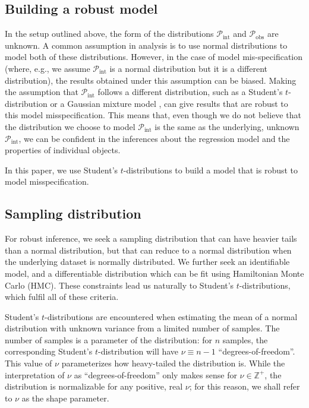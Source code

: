 \documentclass[fleqn,usenatbib]{rasti}
\begin{document}
\subsection{Building a robust model}
\label{sec:formalism.robust}

In the setup outlined above, the form of the distributions
$\mathcal{P}_{\text{int}}$ and
$\mathcal{P}_{\text{obs}}$ are unknown. A common
assumption in analysis is to use normal distributions to model both of these
distributions. However, in the case of model mis-specification (where, e.g., we
assume $\mathcal{P}_{\text{int}}$ is a normal distribution but it is a different
distribution), the results obtained under this assumption can be biased.
Making the assumption that $\mathcal{P}_{\text{int}}$ follows a different
distribution, such as a Student's $t$-distribution \citep{Andrews:1974} or a Gaussian
mixture model \citep{Aitkin:1980}, can give results that are robust to this model
misspecification. This means that, even though we do not believe that the
distribution we choose to model $\mathcal{P}_{\text{int}}$ is the same as the
underlying, unknown $\mathcal{P}_{\text{int}}$, we can be confident in the
inferences about the regression model and the properties of individual objects.

In this paper, we use Student's $t$-distributions to build a model that is
robust to model misspecification.

\subsection{Sampling distribution}
\label{sec:formalism.sampling}

For robust inference, we seek a sampling distribution that can have heavier
tails than a normal distribution, but that can reduce to a normal distribution
when the underlying dataset is normally distributed. We further seek an
identifiable model, and a differentiable distribution which can be fit using
Hamiltonian Monte Carlo (HMC). These constraints lead us naturally to Student's
$t$-distributions, which fulfil all of these criteria.

Student's $t$-distributions are encountered when estimating the mean of a normal
distribution with unknown variance from a limited number of samples. The number
of samples is a parameter of the distribution: for $n$ samples, the
corresponding Student's $t$-distribution will have $\nu \equiv n - 1$
``degrees-of-freedom''. This value of $\nu$ parameterizes how heavy-tailed the
distribution is. While the interpretation of $\nu$ as ``degrees-of-freedom''
only makes sense for $\nu \in \mathbb Z^+$, the distribution is normalizable for
any positive, real $\nu$; for this reason, we shall refer to $\nu$ as the shape
parameter.
\end{document}
